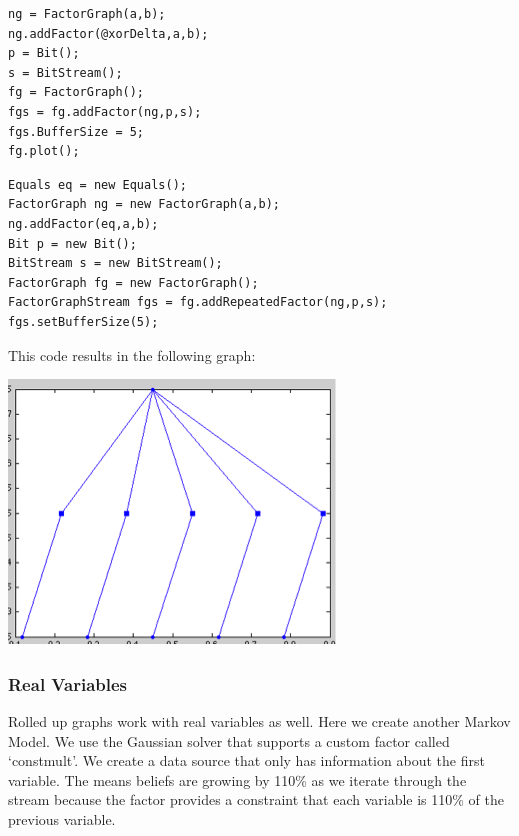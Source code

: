 \ifmatlab
\begin{lstlisting}
ng = FactorGraph(a,b);
ng.addFactor(@xorDelta,a,b);
p = Bit();
s = BitStream();
fg = FactorGraph();
fgs = fg.addFactor(ng,p,s);
fgs.BufferSize = 5;
fg.plot();
\end{lstlisting}
\fi

\ifjava
\begin{lstlisting}
Equals eq = new Equals();
FactorGraph ng = new FactorGraph(a,b);
ng.addFactor(eq,a,b);
Bit p = new Bit();
BitStream s = new BitStream();
FactorGraph fg = new FactorGraph();
FactorGraphStream fgs = fg.addRepeatedFactor(ng,p,s);
fgs.setBufferSize(5);
\end{lstlisting}
\fi


This code results in the following graph:

\includegraphics{images/RolledUpParameter.png}

\subsubsection{Real Variables}

Rolled up graphs work with real variables as well.  Here we create another Markov Model.  We use the Gaussian solver that supports a custom factor called `constmult'.  We create a data source that only has information about the first variable.  The means beliefs are growing by 110\% as we iterate through the stream because the factor provides a constraint that each variable is 110\% of the previous variable.

